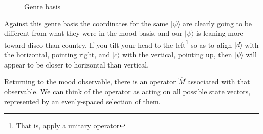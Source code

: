 \begin{figure}[h]
  \centering
  \centering
  \caption{Genre basis} \label{fig:genre-basis}
\end{figure}

Against this genre basis the coordinates for the same $|\psi\rangle$ are clearly going to be different from what they were in the mood basis, and our $|\psi\rangle$ is leaning more toward disco than country. If you tilt your head to the left\footnote{That is, apply a unitary operator} so as to align $|d\rangle$ with the horizontal, pointing right, and $|c\rangle$ with the vertical, pointing up, then $|\psi\rangle$ will appear to be closer to horizontal than vertical.

Returning to the mood observable, there is an operator $\hat{M}$ associated with that observable. We can think of the operator as acting on all possible state vectors, represented by an evenly-spaced selection of them.

